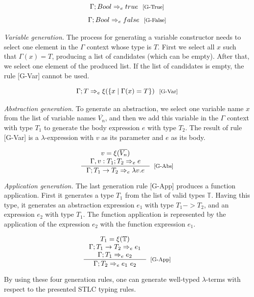 \documentclass[tese,capa,english]{texufpel}
\begin{document}
\[
  \Gamma ; Bool \Rightarrow_e true \ \ \footnotesize\textrm{[G-True]} 
\]
\[
  \Gamma ; Bool \Rightarrow_e false \ \ \footnotesize\textrm{[G-False]}
\]


\vspace{5pt}
\noindent\emph{Variable generation.} The process for generating a variable constructor needs to select one element in the $\Gamma$ context whose type is $T$. First we select all $x$ such that $\Gamma(x) = T$, producing a list of candidates (which can be empty). After that, we select one element of the produced list. If the list of candidates is empty, the rule {\footnotesize\textrm{[G-Var]}} cannot be used.

\[
  \Gamma ; T \Rightarrow_e \xi(\{x \mid \Gamma(x) = T\}) \ \ \footnotesize\textrm{[G-Var]}
\]

\vspace{5pt}
\noindent\emph{Abstraction generation.} To generate an abstraction, we select one variable name $x$ from the list of variable names $\overline{V_n}$, and then we add this variable in the $\Gamma$ context with type $T_1$ to generate the body expression $e$ with type $T_2$. The result of rule {\footnotesize\textrm{[G-Var]}} is a $\lambda$-expression with $v$ as its parameter and $e$ as its body. 

\[
  \inference{v = \xi(\overline{V_n}) \\
            \Gamma , v : T_1 ; T_2 \Rightarrow_e e}
            {\Gamma ; T_1 \rightarrow T_2 \Rightarrow_e \lambda v . e}[\textrm{[G-Abs]}]
\]

\vspace{5pt}
\noindent\emph{Application generation.} The last generation rule {\footnotesize\textrm{[G-App]}} produces a function application. First it generates a type $T_1$ from the list of valid types $\mathbb{T}$. Having this type, it generates an abstraction expression $e_1$ with type $T_1 -> T_2$, and an expression $e_2$ with type $T_1$. The function application is represented by the application of the expression $e_2$ with the function expression $e_1$. 

\[
  \inference{T_1 = \xi(\mathbb{T}) \\
             \Gamma ; T_1 -> T_2 \Rightarrow_e e_1 \\
             \Gamma ; T_1 \Rightarrow_e e_2}
            {\Gamma ; T_2 \Rightarrow_e e_1 ~ e_2}[\textrm{[G-App]}]
\]

By using these four generation rules, one can generate well-typed $\lambda$-terms with respect to the presented STLC typing rules.
\end{document}
